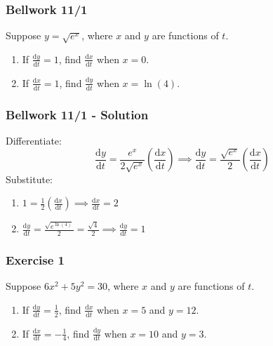\documentclass[12pt]{beamer}
\begin{document}
\begin{frame}
	\frametitle{Bellwork 11/1}
	\initclock

	\vfill
	\vfill
	\vfill
	\vfill
	\large
	Suppose $y=\sqrt{e^x}$, where $x$ and $y$ are functions of $t$.
	\vfill
	\begin{enumerate}\itemsep2ex
		\item If $\frac{\mathrm{d}y}{\mathrm{d}t} = 1$, find $\frac{\mathrm{d}x}{\mathrm{d}t}$ when $x=0$.
		\item If $\frac{\mathrm{d}x}{\mathrm{d}t} = 1$, find $\frac{\mathrm{d}y}{\mathrm{d}t}$ when $x=\ln(4)$.
	\end{enumerate}
	\vfill
	\vfill
	\vfill
	\vfill
	\vfill
	\vfill
	\vfill

	\small
	\crono
\end{frame}
\begin{frame}
	\frametitle{Bellwork 11/1 - Solution}

	\large
	Differentiate:
	\[\frac{\mathrm{d}y}{\mathrm{d}t}=\frac{e^x}{2\sqrt{e^x}}\left(\frac{\mathrm{d}x}{\mathrm{d}t}\right)\implies \frac{\mathrm{d}y}{\mathrm{d}t}=\frac{\sqrt{e^x}}{2}\left(\frac{\mathrm{d}x}{\mathrm{d}t}\right)\]
	Substitute:
	\begin{enumerate}\itemsep2ex
		\item $1=\frac{1}{2}\left(\frac{\mathrm{d}x}{\mathrm{d}t}\right)\implies \boxed{\frac{\mathrm{d}x}{\mathrm{d}t}=2}$
		\item $\frac{\mathrm{d}y}{\mathrm{d}t}=\frac{\sqrt{e^{\ln(4)}}}{2}=\frac{\sqrt{4}}{2}\implies \boxed{\frac{\mathrm{d}y}{\mathrm{d}t}=1}$
	\end{enumerate}
\end{frame}
\begin{frame}
	\frametitle{Exercise 1}

	\vfill
	\vfill
	\vfill
	\Large
	Suppose $6x^2+5y^2=30$, where $x$ and $y$ are functions of $t$.
	\vfill
	\large
	\begin{enumerate}\itemsep2ex
		\item If $\frac{\mathrm{d}y}{\mathrm{d}t} = \frac{1}{2}$, find $\frac{\mathrm{d}x}{\mathrm{d}t}$ when $x=5$ and $y=12$.
		\item If $\frac{\mathrm{d}x}{\mathrm{d}t} = -\frac{1}{4}$, find $\frac{\mathrm{d}y}{\mathrm{d}t}$ when $x=10$ and $y=3$.
	\end{enumerate}
	\vfill
	\vfill
	\vfill
\end{frame}
\end{document}
